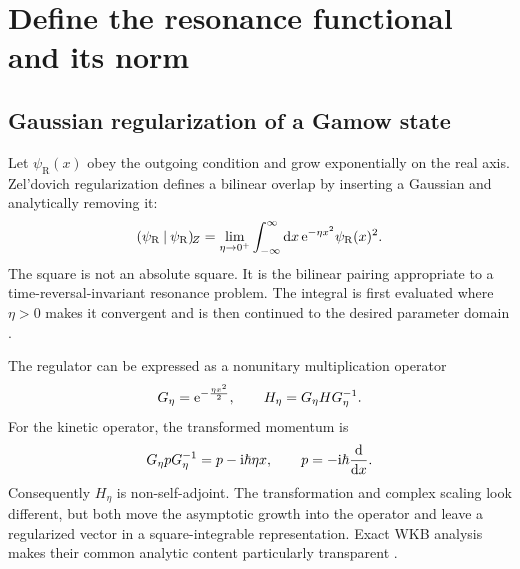 \section{Define the resonance functional and its norm}
\label{sec:rigged-hilbert}

\subsection{Gaussian regularization of a Gamow state}
\label{subsec:zeldovich}

Let $\psi_{\mathrm R}(x)$ obey the outgoing condition and grow exponentially
on the real axis.  Zel'dovich regularization defines a bilinear overlap by
inserting a Gaussian and analytically removing it:
\begin{equation}
  (\psi_{\mathrm R}\mathbin{|}\psi_{\mathrm R})_{\!Z}
  =\lim_{\eta\to0^+}
  \int_{-\infty}^{\infty}\mathrm{d} x\,
  \mathrm{e}^{-\eta x^2}\psi_{\mathrm R}(x)^2 .
  \label{eq:zeldovich-norm}
\end{equation}
The square is not an absolute square.  It is the bilinear pairing appropriate
to a time-reversal-invariant resonance problem.  The integral is first
evaluated where $\eta>0$ makes it convergent and is then continued to the
desired parameter domain
\cite{Zel'dovich:1961,Berggren:1968zz}.

The regulator can be expressed as a nonunitary multiplication operator
\begin{equation}
  G_\eta=\mathrm{e}^{-\frac{\eta x^2}{2}},
  \qquad
  H_\eta=G_\eta H G_\eta^{-1} .
  \label{eq:zeldovich-transform}
\end{equation}
For the kinetic operator, the transformed momentum is
\begin{equation}
  G_\eta pG_\eta^{-1}=p-\mathrm{i}\hbar\eta x,
  \qquad p=-\mathrm{i}\hbar\frac{\mathrm{d}}{\mathrm{d} x} .
  \label{eq:zeldovich-momentum}
\end{equation}
Consequently $H_\eta$ is non-self-adjoint.  The transformation and complex
scaling look different, but both move the asymptotic growth into the operator
and leave a regularized vector in a square-integrable representation.  Exact
WKB analysis makes their common analytic content particularly transparent
\cite{Morikawa:2025xjq}.

